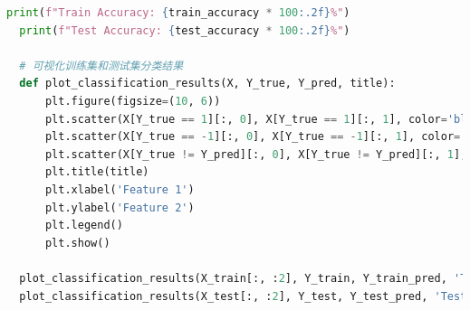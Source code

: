 \documentclass[12pt]{article}
\begin{document}
\begin{lstlisting}[language=Python]
  print(f"Train Accuracy: {train_accuracy * 100:.2f}%")
  print(f"Test Accuracy: {test_accuracy * 100:.2f}%")
  
  # 可视化训练集和测试集分类结果
  def plot_classification_results(X, Y_true, Y_pred, title):
      plt.figure(figsize=(10, 6))
      plt.scatter(X[Y_true == 1][:, 0], X[Y_true == 1][:, 1], color='blue', label='Positive Class')
      plt.scatter(X[Y_true == -1][:, 0], X[Y_true == -1][:, 1], color='red', label='Negative Class')
      plt.scatter(X[Y_true != Y_pred][:, 0], X[Y_true != Y_pred][:, 1], color='yellow', edgecolor='black', label='Misclassified')
      plt.title(title)
      plt.xlabel('Feature 1')
      plt.ylabel('Feature 2')
      plt.legend()
      plt.show()
  
  plot_classification_results(X_train[:, :2], Y_train, Y_train_pred, 'Training Set Classification(QP)')
  plot_classification_results(X_test[:, :2], Y_test, Y_test_pred, 'Test Set Classification(QP)')  
  
\end{lstlisting}
\end{document}
